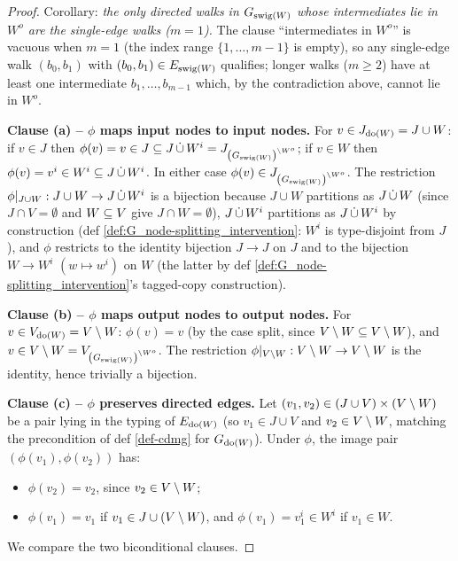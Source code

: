 \documentclass[main]{subfiles}
\begin{document}
\begin{proof}
Corollary: \emph{the only directed walks in $G_{\mathrm{swig}(W)}$ whose intermediates lie in $W^o$ are the single-edge walks ($m = 1$).} The clause ``intermediates in $W^o$'' is vacuous when $m = 1$ (the index range $\{1, \ldots, m-1\}$ is empty), so any single-edge walk $(b_0, b_1)$ with $(b_0, b_1) \in E_{\mathrm{swig}(W)}$ qualifies; longer walks ($m \ge 2$) have at least one intermediate $b_1, \ldots, b_{m-1}$ which, by the contradiction above, cannot lie in $W^o$.

\medskip\noindent\textbf{Clause (a) -- $\phi$ maps input nodes to input nodes.}
For $v \in J_{\operatorname{do}(W)} = J \cup W$: if $v \in J$ then $\phi(v) = v \in J \subseteq J \,\dot{\cup}\, W^i = J_{\left ( G_{\mathrm{swig}(W)} \right )^{\setminus W^o}}$; if $v \in W$ then $\phi(v) = v^i \in W^i \subseteq J \,\dot{\cup}\, W^i$. In either case $\phi(v) \in J_{\left ( G_{\mathrm{swig}(W)} \right )^{\setminus W^o}}$. The restriction $\phi\rvert_{J \cup W} : J \cup W \to J \,\dot{\cup}\, W^i$ is a bijection because $J \cup W$ partitions as $J \,\dot{\cup}\, W$ (since $J \cap V = \emptyset$ and $W \subseteq V$ give $J \cap W = \emptyset$), $J \,\dot{\cup}\, W^i$ partitions as $J \,\dot{\cup}\, W^i$ by construction (def \ref{def:G_node-splitting_intervention}: $W^i$ is type-disjoint from $J$), and $\phi$ restricts to the identity bijection $J \to J$ on $J$ and to the bijection $W \to W^i$ $(w \mapsto w^i)$ on $W$ (the latter by def \ref{def:G_node-splitting_intervention}'s tagged-copy construction). \checkmark

\medskip\noindent\textbf{Clause (b) -- $\phi$ maps output nodes to output nodes.}
For $v \in V_{\operatorname{do}(W)} = V \setminus W$: $\phi(v) = v$ (by the case split, since $V \setminus W \subseteq V \setminus W$), and $v \in V \setminus W = V_{\left ( G_{\mathrm{swig}(W)} \right )^{\setminus W^o}}$. The restriction $\phi\rvert_{V \setminus W} : V \setminus W \to V \setminus W$ is the identity, hence trivially a bijection. \checkmark

\medskip\noindent\textbf{Clause (c) -- $\phi$ preserves directed edges.}
Let $(v_1, v_2) \in (J \cup V) \times (V \setminus W)$ be a pair lying in the typing of $E_{\operatorname{do}(W)}$ (so $v_1 \in J \cup V$ and $v_2 \in V \setminus W$, matching the precondition of def \ref{def-cdmg} for $G_{\operatorname{do}(W)}$). Under $\phi$, the image pair $(\phi(v_1), \phi(v_2))$ has:
\begin{itemize}
    \item $\phi(v_2) = v_2$, since $v_2 \in V \setminus W$;
    \item $\phi(v_1) = v_1$ if $v_1 \in J \cup (V \setminus W)$, and $\phi(v_1) = v_1^i \in W^i$ if $v_1 \in W$.
\end{itemize}

We compare the two biconditional clauses.


\end{proof}
\end{document}
